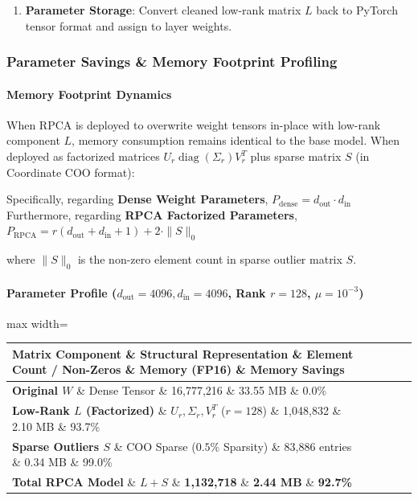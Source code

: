\begin{enumerate}
\item \textbf{Parameter Storage}: Convert cleaned low-rank matrix $L$ back to PyTorch tensor format and assign to layer weights.


\end{enumerate}
\subsubsection*{Parameter Savings \& Memory Footprint Profiling}

\paragraph{Memory Footprint Dynamics}
When RPCA is deployed to overwrite weight tensors in-place with low-rank component $L$, memory consumption remains identical to the base model. When deployed as factorized matrices $U_r \operatorname{diag}(\Sigma_r) V_r^T$ plus sparse matrix $S$ (in Coordinate COO format):

Specifically, regarding \textbf{Dense Weight Parameters}, $P_{\text{dense}} = d_{\text{out}} \cdot d_{\text{in}}$ Furthermore, regarding \textbf{RPCA Factorized Parameters}, $P_{\text{RPCA}} = r(d_{\text{out}} + d_{\text{in}} + 1) + 2 \cdot \|S\|_0$


where $\|S\|_0$ is the non-zero element count in sparse outlier matrix $S$.

\paragraph{Parameter Profile ($d_{\text{out}}=4096, d_{\text{in}}=4096$, Rank $r=128$, $\mu=10^{-3}$)}

\begin{center}
\begin{adjustbox}{max width=\columnwidth}
\renewcommand{\arraystretch}{1.2}
\begin{tabular}{lllll}
\toprule
Matrix Component \& Structural Representation \& Element Count / Non-Zeros \& Memory (FP16) \& Memory Savings \\
\midrule
\textbf{Original $W$} \& Dense Tensor \& 16,777,216 \& 33.55 MB \& 0.0\% \\
\textbf{Low-Rank $L$ (Factorized)} \& $U_r, \Sigma_r, V_r^T$ ($r=128$) \& 1,048,832 \& 2.10 MB \& 93.7\% \\
\textbf{Sparse Outliers $S$} \& COO Sparse ($0.5\%$ Sparsity) \& 83,886 entries \& 0.34 MB \& 99.0\% \\
\textbf{Total RPCA Model} \& $L + S$ \& \textbf{1,132,718} \& \textbf{2.44 MB} \& \textbf{92.7\%} \\

\bottomrule
\end{tabular}
\end{adjustbox}
\end{center}

